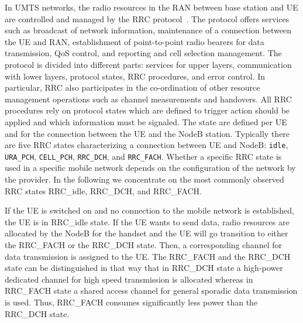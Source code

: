 In UMTS networks, the radio resources in the RAN between base station and UE are controlled and managed by the \gls{RRC} protocol~\cite{3GPP_RRC_Spec}.
The protocol offers services such as broadcast of network information, maintenance of a connection between the \gls{UE} and \gls{RAN}, establishment of point-to-point radio bearers for data transmission, \gls{QoS} control, and reporting and cell selection management.
The protocol is divided into different parts: services for upper layers, communication with lower layers, protocol states, \gls{RRC} procedures, and error control.
In particular, \gls{RRC} also participates in the co-ordination of other resource management operations such as channel measurements and handovers.
All \gls{RRC} procedures rely on protocol states which are defined to trigger action should be applied and which information must be signaled. 
The state are defined per \gls{UE} and for the connection between the \gls{UE} and the \gls{NodeB} station.
Typically there are five \gls{RRC} states characterizing a connection between \gls{UE} and \gls{NodeB}: \texttt{idle}, \texttt{URA\_PCH}, \texttt{CELL\_PCH}, \texttt{RRC\_DCH}, and \texttt{RRC\_FACH}.
Whether a specific \gls{RRC} state is used in a specific mobile network depends on the configuration of the network by the provider.
In the following we concentrate on the most commonly observed~\cite{Qian2010a} \gls{RRC} states \gls{RRC_idle}, \gls{RRC_DCH}, and \gls{RRC_FACH}.

If the \gls{UE} is switched on and no connection to the mobile network is established, the \gls{UE} is in \gls{RRC_idle} state.
If the \gls{UE} wants to send data, radio resources are allocated by the \gls{NodeB} for the handset and the \gls{UE} will go transition to either the \gls{RRC_FACH} or the \gls{RRC_DCH} state. 
Then, a corresponding channel for data transmission is assigned to the \gls{UE}.
The \gls{RRC_FACH} and the \gls{RRC_DCH} state can be distinguished in that way that in \gls{RRC_DCH} state a high-power dedicated channel for high speed transmission is allocated whereas in \gls{RRC_FACH} state a shared access channel for general sporadic data transmission is used.
Thus, \gls{RRC_FACH} consumes significantly less power than the \gls{RRC_DCH} state. 

